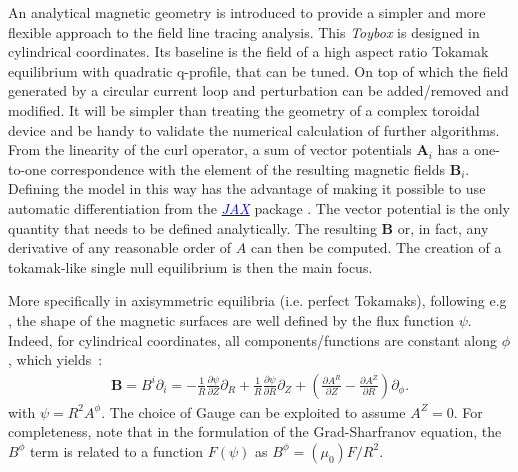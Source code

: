 An analytical magnetic geometry is introduced to provide a simpler and more flexible approach to the field line tracing analysis. This \textit{Toybox} is designed in cylindrical coordinates. Its baseline is the field of a high aspect ratio Tokamak equilibrium with quadratic q-profile, that can be tuned. On top of which the field generated by a circular current loop and perturbation can be added/removed and modified. It will be simpler than treating the geometry of a complex toroidal device and be handy to validate the numerical calculation of further algorithms. From the linearity of the curl operator, a sum of vector potentials $\textbf{A}_i$ has a one-to-one correspondence with the element of the resulting magnetic fields $\textbf{B}_i$. Defining the model in this way has the advantage of making it possible to use automatic differentiation from the 
\href{https://jax.readthedocs.io/en/latest/index.html}{\textcolor{blue}{\textit{JAX}}}
package \cite{bradbury_jax_2018}. The vector potential is the only quantity that needs to be defined analytically. The resulting $\textbf{B}$ or, in fact, any derivative of any reasonable order of $A$ can then be computed. The creation of a tokamak-like single null equilibrium is then the main focus.

More specifically in axisymmetric equilibria (i.e. perfect Tokamaks), following e.g \cite[p.108]{wesson_tokamaks_2011}, the shape of the magnetic surfaces are well defined by the flux function  $\psi$. Indeed, for cylindrical coordinates, all components/functions are constant along $\phi$, which yields~:
\begin{align*}
    \textbf{B} = B^i\partial_i = -\frac{1}{R}\frac{\partial\psi}{\partial Z}\partial_R +\frac{1}{R}\frac{\partial\psi}{\partial R}\partial_Z + \left(\frac{\partial A^R}{\partial Z} - \frac{\partial A^Z}{\partial R}\right)\partial_\phi.
\end{align*}
with $\psi = R^2 A^\phi$. The choice of Gauge can be exploited to assume $A^Z = 0$. For completeness, note that in the formulation of the Grad-Sharfranov equation, the $B^\phi$ term is related to a function $F(\psi)$ as $B^\phi = (\mu_0) F/R^2$.

